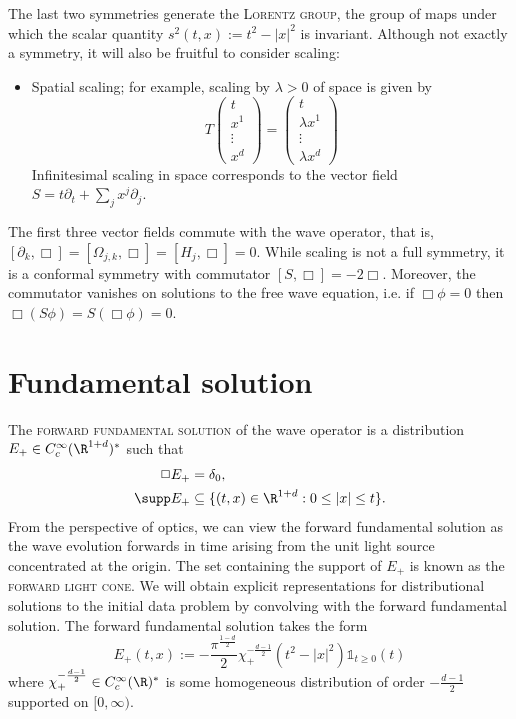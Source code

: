 \documentclass[reqno]{amsart}
\theoremstyle{definition}
\theoremstyle{remark}
\newcounter{problem}[section]	\declaretheorem[style=thmrecbox,name=Problem, numberlike=problem]{statement}
\renewcommand{\emph}{\textsc}
\begin{document}
The last two symmetries generate the \emph{Lorentz group}, the group of maps under which the scalar quantity $s^2 (t, x) := t^2 - |x|^2$ is invariant. Although not exactly a symmetry, it will also be fruitful to consider scaling:
\begin{itemize}
	\item Spatial scaling; for example, scaling by $\lambda > 0$ of space is given by 
				\[
					T
					\begin{pmatrix}
						t \\ x^1 \\ \vdots \\ x^d
					\end{pmatrix}
					=
					\begin{pmatrix}
						t \\ \lambda x^1\\ \vdots \\ \lambda x^d
					\end{pmatrix}
				\]
			Infinitesimal scaling in space corresponds to the vector field $S = t \partial_t + \sum_j x^j \partial_j$. 		 
\end{itemize}
The first three vector fields commute with the wave operator, that is, $[\partial_k, \Box] = [\Omega_{j, k}, \Box] = [H_j, \Box] = 0$. While scaling is not a full symmetry, it is a conformal symmetry with commutator $[S, \Box] = -2 \Box$. Moreover, the commutator vanishes on solutions to the free wave equation, i.e. if $\Box \phi = 0$ then $\Box (S \phi) = S(\Box \phi) = 0$. 

\section{Fundamental solution}

The \emph{forward fundamental solution} of the wave operator is a distribution $E_+ \in C^\infty_c (\R^{1 + d})^*$ such that 
	\begin{align*}
			\Box E_+
				&= \delta_0, \\
			\supp E_+
				&\subseteq \{ (t, x) \in \R^{1 + d} : 0 \leq |x| \leq t \}.	
	\end{align*}
From the perspective of optics, we can view the forward fundamental solution as the wave evolution forwards in time arising from the unit light source concentrated at the origin. The set containing the support of $E_+$ is known as the \emph{forward light cone}. We will obtain explicit representations for distributional solutions to the initial data problem by convolving with the forward fundamental solution. The forward fundamental solution takes the form
	\[ E_+ (t, x) := -\frac{\pi^{\frac{1 - d}{2}}}{2}  \chi_+^{-\frac{d - 1}{2}} (t^2 - |x|^2) \mathbb 1_{t \geq 0} (t) \]
where $\chi_+^{-\frac{d - 1}{2}} \in C^\infty_c (\R)^*$ is some homogeneous distribution of order $-\tfrac{d - 1}{2}$ supported on $[0, \infty)$. 
\end{document}

